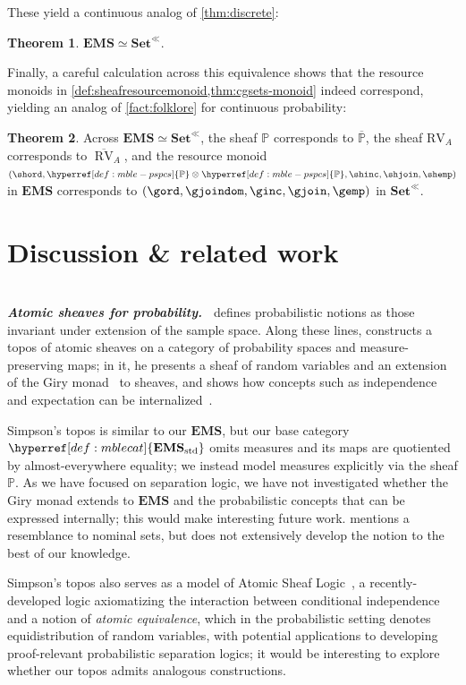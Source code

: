\documentclass[
  sigconf,
  screen, ]{acmart}
\theoremstyle{definition}
\newtheorem{theorem}{Theorem}[section]
\newcommand\goodparagraph[1]{\hspace{0em}\\[-0.5em]\textbf{\textit{#1.~}}}
\newcommand\nref[2]{\hyperref[#1]{#2}} \newcommand\checkhigh{{\huge{\color{red}\textbf{TODO: check}}}}
\newcommand\agoodnamecat{\mathbf{Set}^\ll}
\newcommand\goodsheafcat{\mathbf{EMS}}
\newcommand\texStdMble{\mathbf{EMS}_{\rm std}}
\newcommand\StdMble{{\nref{def:mblecat}{\texStdMble}}}
\newcommand\RV{\mathrm{RV}}
\newcommand\RVshf{{\nref{lem:rv-mble-sheaf}{\RV}}}
\newcommand\texpspcs{\mathbb P}
\newcommand\pspcs{{\nref{def:mble-pspcs}{\texpspcs}}}
\newcommand\sheafcat{{\nref{def:sheafcat}{\goodsheafcat}}}
\newcommand\texgpspcs{\overline{\mathbb P}}
\newcommand\gpspcs{{\nref{def:gpspcs}{\texgpspcs}}}
\newcommand\texgRV{\overline{\operatorname{RV}}}
\newcommand\gRV{{\nref{def:gRV}{\texgRV}}}
\newcommand\cgsets{{\nref{def:cgsets}{\agoodnamecat}}}
\begin{document}
These yield a continuous analog of \cref{thm:discrete}:
\begin{theorem} \label{thm:cont}
  $\sheafcat\simeq\cgsets$.
\end{theorem}

Finally, a careful calculation across this equivalence
shows that the resource monoids in 
\cref{def:sheafresourcemonoid,thm:cgsets-monoid}
indeed correspond, yielding
an analog of \cref{fact:folklore} for continuous probability:

\begin{theorem} \label{thm:krm-corresp}
Across $\sheafcat\simeq\cgsets$,
the sheaf $\pspcs$ corresponds to $\gpspcs$,
the sheaf $\RVshf_A$ corresponds to $\gRV_A$,
and the resource monoid
$(\shord,\pspcs\otimes\pspcs,\shinc,\shjoin,\shemp)$
in $\sheafcat$
corresponds to
$(\gord,\gjoindom,\ginc,\gjoin,\gemp)$
in $\cgsets$.
\end{theorem}

\section{Discussion \& related work} \label{sec:discussion}

\goodparagraph{Atomic sheaves for probability} \citet{tao_2015}
defines probabilistic notions as those invariant under extension of
the sample space. Along these lines,
\citet{simpson2017probability} constructs a topos of
atomic sheaves on a category of probability spaces and measure-preserving
maps; in it, he presents a sheaf of random variables
and an extension of the Giry monad~\cite{giry2006categorical} to sheaves,
and shows how concepts such as independence
and expectation can be internalized~\cite{simpsonsheafslides,simpsonSyntheticProbabilityTheory}.

Simpson's topos is similar to our $\sheafcat$, but
our base category $\StdMble$ omits measures
and its maps are quotiented by almost-everywhere equality;
we instead model measures explicitly via the sheaf $\pspcs$.
As we have focused on separation logic,
we have not investigated whether the Giry monad
extends to $\sheafcat$ and
the probabilistic concepts that can be expressed internally;
this would make interesting future work.
\citet{simpson2017probability}
mentions a resemblance to nominal sets,
but does not extensively develop the notion to the best of our knowledge. 

Simpson's topos also serves as a model of Atomic Sheaf Logic~\cite{equivalenceandconditionalindependenceinatomicsheaflogic},
a recently-developed logic axiomatizing the interaction between conditional independence and a notion of
\emph{atomic equivalence}, which in the probabilistic setting denotes equidistribution of random variables,
with potential applications to developing proof-relevant probabilistic separation logics;
it would be interesting to explore whether our topos admits analogous constructions.
\end{document}
